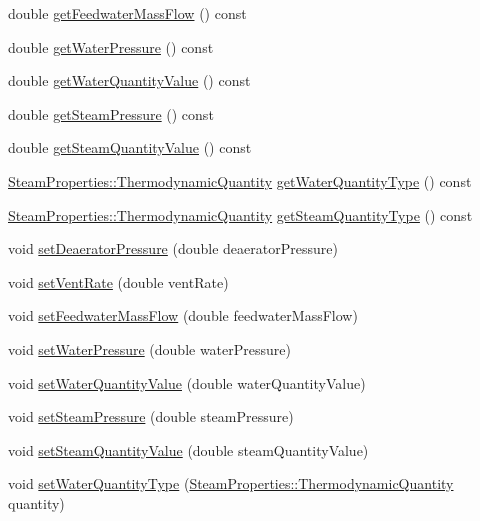 \begin{DoxyCompactItemize}
\item 
double \hyperlink{class_deaerator_ae1524e8b406c3d5c2823ae4e6bafe389}{get\+Feedwater\+Mass\+Flow} () const
\item 
double \hyperlink{class_deaerator_ae86ef305a8641d61ec76bd39bb84f28b}{get\+Water\+Pressure} () const
\item 
double \hyperlink{class_deaerator_a9362430fb04802b6f14c9bf09d62a466}{get\+Water\+Quantity\+Value} () const
\item 
double \hyperlink{class_deaerator_aebe779c63cace193d040f497e3b70728}{get\+Steam\+Pressure} () const
\item 
double \hyperlink{class_deaerator_a5473feedca64e7c44143d422ed3e2401}{get\+Steam\+Quantity\+Value} () const
\item 
\hyperlink{class_steam_properties_ae0294bedf7d178c2d8fb6aed0f62fbff}{Steam\+Properties\+::\+Thermodynamic\+Quantity} \hyperlink{class_deaerator_a414282f81906e09a28bc75cf51659ec2}{get\+Water\+Quantity\+Type} () const
\item 
\hyperlink{class_steam_properties_ae0294bedf7d178c2d8fb6aed0f62fbff}{Steam\+Properties\+::\+Thermodynamic\+Quantity} \hyperlink{class_deaerator_a18abbdc5ec78f71e1d2495b0c64c77ec}{get\+Steam\+Quantity\+Type} () const
\item 
void \hyperlink{class_deaerator_a5b20d3aba98b21928cce70b45e843ff3}{set\+Deaerator\+Pressure} (double deaerator\+Pressure)
\item 
void \hyperlink{class_deaerator_a11e71194f58763a57ec0f7d05a21782d}{set\+Vent\+Rate} (double vent\+Rate)
\item 
void \hyperlink{class_deaerator_ada95cb2557bc43602d7bcefbad66c853}{set\+Feedwater\+Mass\+Flow} (double feedwater\+Mass\+Flow)
\item 
void \hyperlink{class_deaerator_ae23f64c6983daed388a73c033a15e176}{set\+Water\+Pressure} (double water\+Pressure)
\item 
void \hyperlink{class_deaerator_ac31cf2deb8bf30ee6921d1d9f8281eb8}{set\+Water\+Quantity\+Value} (double water\+Quantity\+Value)
\item 
void \hyperlink{class_deaerator_a5936221e68b5ba3245f0adabed74e6d7}{set\+Steam\+Pressure} (double steam\+Pressure)
\item 
void \hyperlink{class_deaerator_a101399a8b66c3ff1fecf884fd1b1373d}{set\+Steam\+Quantity\+Value} (double steam\+Quantity\+Value)
\item 
void \hyperlink{class_deaerator_ac60ad3d6650ed6c7783d18833bb7e3dd}{set\+Water\+Quantity\+Type} (\hyperlink{class_steam_properties_ae0294bedf7d178c2d8fb6aed0f62fbff}{Steam\+Properties\+::\+Thermodynamic\+Quantity} quantity)

\end{DoxyCompactItemize}
